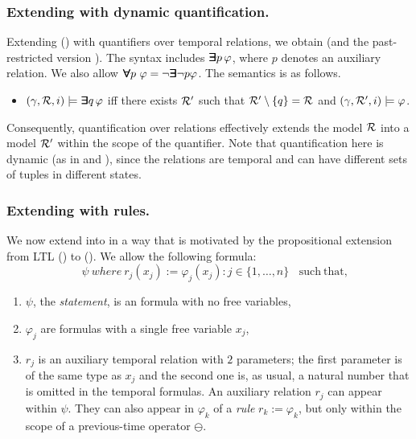 \subsubsection{Extending \FLTL{} with dynamic quantification.}




Extending \FLTL{} (\PFLTL{}) with quantifiers over temporal relations, we obtain \QFLTL{}
(and the past-restricted version \QPFLTL{}). 
The syntax includes $\bm{\exists}\kern-0.6em\bm{\exists} p \, \varphi$, 
where $p$ denotes an auxiliary relation.
We also allow $\bm{\forall}\kern-0.6em\bm{\forall} p\ \varphi = \neg \bm{\exists}\kern-0.6em\bm{\exists} \neg p \varphi$. The semantics is as follows. %




\begin{itemize}
\item $(\gamma ,  {\cal R}, i) \models \bm{\exists}\kern-0.6em\bm{\exists} q \, \varphi$ iff there exists
${\cal R}'$ such that ${\cal R}' \setminus {\{ q \} } = {\cal R}$ and 
$( \gamma, {\cal R}' , i) \models \varphi$.
\end{itemize}
Consequently, quantification over relations effectively extends the model ${\cal R}$ into a model ${\cal R}'$ within the scope of the quantifier. Note that quantification here is dynamic (as in \QLTL{} and \QPLTL{}), since the relations are temporal and can have different sets of tuples in different states.

\subsubsection{Extending \FLTL{}  with rules.}

We now extend \FLTL{} into \EFLTL{} in a way that is motivated by the  propositional extension from LTL (\PLTL{}) to \ELTL{} (\EPLTL{}). We allow the following formula:
\begin{equation}
\label{EFLTL}
\ \ \ \ \ \psi \mathit{\ where\ } r_j  ( x_j ) := 
\varphi_j (x_j) : j \in \{ 1 , \ldots , n \} \mathrm{\ \ \ \     such\ that,}
\end{equation}
\begin{enumerate}
\item $\psi$, the {\em statement}, is an \FLTL{} formula with
no free variables, 
\item $\varphi_j$ are \PFLTL{} formulas with a single
free variable $x_j$,
\item $r_j$ is an auxiliary temporal relation with $2$ parameters; the first parameter is of the same 
type as $x_j$ and the second one is, as usual,
a natural number that is omitted in the temporal formulas. 
An auxiliary relation $r_j$ can appear within $\psi$. They can also appear in $\varphi_k$ of a {\em rule} $r_k := \varphi_k$, but only within the
scope
of a previous-time operator $\ominus$. 
\end{enumerate}

